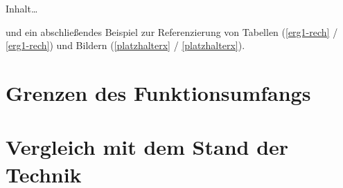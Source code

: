 
Inhalt\ldots

und ein abschließendes Beispiel zur Referenzierung von Tabellen (\ref{erg1-rech} / \autoref{erg1-rech}) und Bildern (\ref{platzhalterx} / \autoref{platzhalterx}).

\section{Grenzen des Funktionsumfangs}


\section{Vergleich mit dem Stand der Technik}
